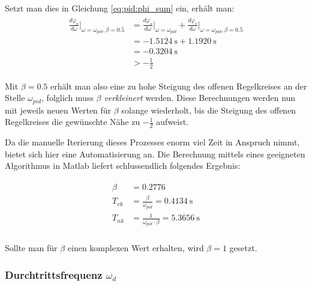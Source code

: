 Setzt man dies in Gleichung \ref{eq:pid:phi_sum} ein, erh\"alt man:
\begin{gather} \label{eq:pid:phi_sum_result_iteration_one}
    \begin{split}
    \frac{d\varphi_o}{d\omega}       \biggr \rvert_{\omega=\omega_{pid}, \beta=0.5}
        & = \frac{d\varphi_s}{d\omega} \biggr \rvert_{\omega=\omega_{pid}}
        + \frac{d\varphi_r}{d\omega} \biggr \rvert_{\omega=\omega_{pid}, \beta=0.5} \\
        & = \SI{-1.5124}{\second} + \SI{1.1920}{\second} \\
        & = \SI{-0.3204}{\second} \\
        & > -\frac{1}{2}
    \end{split}
\end{gather}

Mit  $\beta  = 0.5$  erh\"alt  man  also eine  zu  hohe  Steigung des  offenen
Regelkreises   an    der   Stelle  $\omega_{pid}$,   folglich   muss   $\beta$
{\em{verkleinert}} werden.   Diese Berechnungen  werden nun mit  jeweils neuen
Werten  f\"ur  $\beta$  solange  wiederholt,  bis  die  Steigung  des  offenen
Regelkreises die gew\"unschte N\"ahe zu $-\frac{1}{2}$ aufweist.

Da die manuelle Iterierung dieses Prozesses enorm viel Zeit in Anspruch nimmt,
bietet  sich  hier  eine  Automatisierung  an. Die  Berechnung  mittels  eines
geeigneten Algorithmus in Matlab liefert schlussendlich folgendes Ergebnis:

\begin{gather} \label{eq:pid:beta_result}
    \begin{split}
        \beta    & = 0.2776 \\
        {T_{vk}} & = \frac{\beta}{\omega_{pid}}           = \SI{0.4134}{\second} \\
        {T_{nk}} & = \frac{1}{\omega_{pid} \cdot \beta}   = \SI{5.3656}{\second} \\
    \end{split}
\end{gather}

Sollte  man  f\"ur  $\beta$  einen komplexen  Wert  erhalten,  wird  $\beta=1$
gesetzt.


\subsubsection{Durchtrittsfrequenz $\omega_d$}

